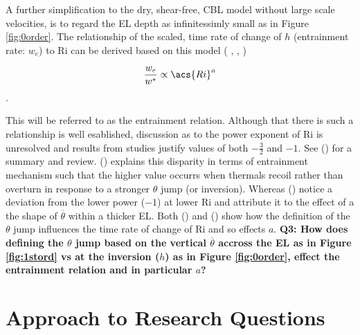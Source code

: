 A further simplification to the dry, shear-free, \acs{CBL} model without large scale velocities, is to regard the \acs{EL} depth as infinitessimly small as in Figure \ref{fig:0order}.  The relationship of the scaled, time rate of change of $h$ (entrainment rate: $w_{e}$) to \acs{Ri} can be derived based on this model (\citeauthor{Tennekes73} \citeyear{Tennekes73}, \citeauthor{Deardorff79} \citeyear{Deardorff79}, \citeauthor{FedConzMir04} \citeyear{FedConzMir04})

\begin{equation}
\frac{w_{e}}{w^{*}} \propto  \acs{Ri}^{a}
\end{equation}.
 
This will be referred to as the entrainment relation.  Although that there is such a relationship is well esablished, discussion as to the power exponent of \acs{Ri} is unresolved and results from studies justify values of both $-\frac{3}{2}$ and $-1$. See \citeauthor{Traum11} (\citeyear{Traum11}) for a summary and review.  \citeauthor{Turner86} (\citeyear{Turner86}) explains this disparity in terms of entrainment mechanism such that the higher value occurrs when thermals recoil rather than overturn in response to a stronger $\theta$ jump (or inversion).  Whereas \citeauthor{SullMoengStev} (\citeyear{SullMoengStev}) notice a deviation from the lower power ($-1$) at lower \acs{Ri} and attribute it to the effect of a the shape of $\overline{\theta}$ within a thicker \acs{EL}.  Both \citeauthor{FedConzMir04} (\citeyear{FedConzMir04}) and \citeauthor{GarciaMellado} (\citeyear{GarciaMellado}) show how the definition of the $\theta$ jump influences the time rate  of change of \acs{Ri} and so effects $a$. \textbf{Q3: How does defining the $\theta$ jump based on the vertical $\overline{\theta}$ accross the \acs{EL} as in Figure \ref{fig:1stord} vs at the inversion ($h$) as in Figure \ref{fig:0order}, effect the entrainment relation and in particular $a$?}\\


\section{Approach to Research Questions}
\label{sec:Approach}

